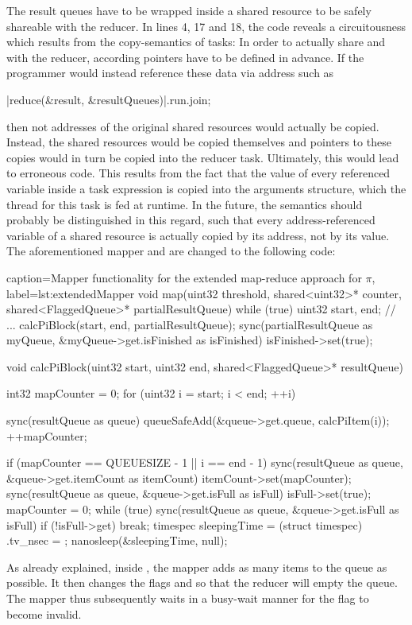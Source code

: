 The result queues have to be wrapped inside a shared resource to be safely shareable with the reducer. In lines 4, 17 and 18, the code reveals a circuitousness which results from the copy-semantics of tasks: In order to actually share  and  with the reducer, according pointers have to be defined in advance. If the programmer would instead reference these data via address such as
\begin{ccode}{}
|reduce(&result, &resultQueues)|.run.join; 
\end{ccode}
then not addresses of the original shared resources would actually be copied. Instead, the shared resources would be copied themselves and pointers to these copies would in turn be copied into the reducer task. Ultimately, this would lead to erroneous code. This results from the fact that the value of every referenced variable inside a task expression is copied into the arguments structure, which the thread for this task is fed at runtime. In the future, the semantics should probably be distinguished in this regard, such that every address-referenced variable of a shared resource is actually copied by its address, not by its value. The aforementioned mapper and  are changed to the following code:
\begin{ccode}{caption=Mapper functionality for the extended map-reduce approach for $\pi$, label=lst:extendedMapper}
void map(uint32 threshold, shared<uint32>* counter, shared<FlaggedQueue>* partialResultQueue) { 
  while (true) { 
    uint32 start, end; 
    // ...     
    calcPiBlock(start, end, partialResultQueue); 
  } 
  sync(partialResultQueue as myQueue, &myQueue->get.isFinished as isFinished) 
      { isFinished->set(true); } 
}

void calcPiBlock(uint32 start, uint32 end, shared<FlaggedQueue>* resultQueue) { 
  int32 mapCounter = 0; 
  for (uint32 i = start; i < end; ++i) {
    sync(resultQueue as queue) { queueSafeAdd(&queue->get.queue, calcPiItem(i)); } 
    ++mapCounter; 
     
    if (mapCounter == QUEUESIZE - 1 || i == end - 1) { 
      sync(resultQueue as queue, &queue->get.itemCount as itemCount) 
          { itemCount->set(mapCounter); } 
      sync(resultQueue as queue, &queue->get.isFull as isFull) { isFull->set(true); } 
      mapCounter = 0; 
      while (true) { 
        sync(resultQueue as queue, &queue->get.isFull as isFull) {if (!isFull->get) { break; }} 
        timespec sleepingTime = (struct timespec){ .tv_nsec = }; 
        nanosleep(&sleepingTime, null); 
      }
    }
  }
}
\end{ccode}
As already explained, inside , the mapper adds as many items to the queue as possible. It then changes the flags  and  so that the reducer will empty the queue. The mapper thus subsequently waits in a busy-wait manner for the  flag to become invalid.

